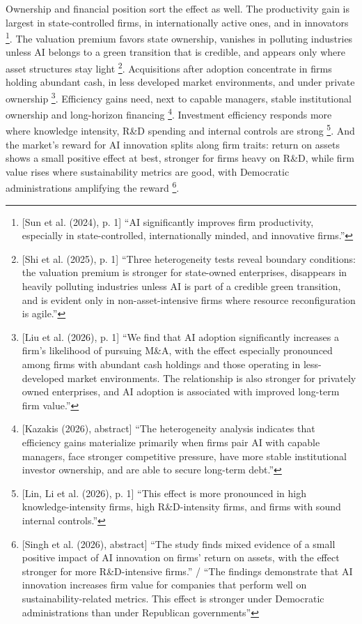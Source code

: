 Ownership and financial position sort the effect as well. The productivity gain is largest in state-controlled firms, in internationally active ones, and in innovators \parencite[p.~1]{sun2024deconstruct}\footnote{[Sun et al. (2024), p. 1] ``AI significantly improves firm productivity, especially in state-controlled, internationally minded, and innovative firms.''}. The valuation premium favors state ownership, vanishes in polluting industries unless AI belongs to a green transition that is credible, and appears only where asset structures stay light \parencite[p.~1]{shi2025value}\footnote{[Shi et al. (2025), p. 1] ``Three heterogeneity tests reveal boundary conditions: the valuation premium is stronger for state-owned enterprises, disappears in heavily polluting industries unless AI is part of a credible green transition, and is evident only in non-asset-intensive firms where resource reconfiguration is agile.''}. Acquisitions after adoption concentrate in firms holding abundant cash, in less developed market environments, and under private ownership \parencite[p.~1]{liu2026artificial}\footnote{[Liu et al. (2026), p. 1] ``We find that AI adoption significantly increases a firm's likelihood of pursuing M\&A, with the effect especially pronounced among firms with abundant cash holdings and those operating in less-developed market environments. The relationship is also stronger for privately owned enterprises, and AI adoption is associated with improved long-term firm value.''}. Efficiency gains need, next to capable managers, stable institutional ownership and long-horizon financing \parencite[abstract]{kazakis2026conditional}\footnote{[Kazakis (2026), abstract] ``The heterogeneity analysis indicates that efficiency gains materialize primarily when firms pair AI with capable managers, face stronger competitive pressure, have more stable institutional investor ownership, and are able to secure long-term debt.''}. Investment efficiency responds more where knowledge intensity, R\&D spending and internal controls are strong \parencite[p.~1]{lin2026role}\footnote{[Lin, Li et al. (2026), p. 1] ``This effect is more pronounced in high knowledge-intensity firms, high R\&D-intensity firms, and firms with sound internal controls.''}. And the market's reward for AI innovation splits along firm traits: return on assets shows a small positive effect at best, stronger for firms heavy on R\&D, while firm value rises where sustainability metrics are good, with Democratic administrations amplifying the reward \parencite[abstract]{singh2026artificial}\footnote{[Singh et al. (2026), abstract] ``The study finds mixed evidence of a small positive impact of AI innovation on firms' return on assets, with the effect stronger for more R\&D-intensive firms.'' / ``The findings demonstrate that AI innovation increases firm value for companies that perform well on sustainability-related metrics. This effect is stronger under Democratic administrations than under Republican governments''}.

